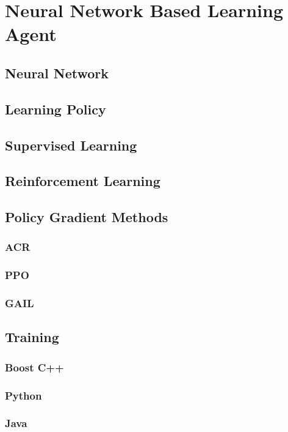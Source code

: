 \chapter{Neural Network Based Learning Agent}
\section{Neural Network}
\section{Learning Policy}
\section{Supervised Learning}
\section{Reinforcement Learning}
\section{Policy Gradient Methods}
\subsection{ACR}
\subsection{PPO}
\subsection{GAIL}
\section{Training}
\subsection{Boost C++}
\subsection{Python}
\subsection{Java}

